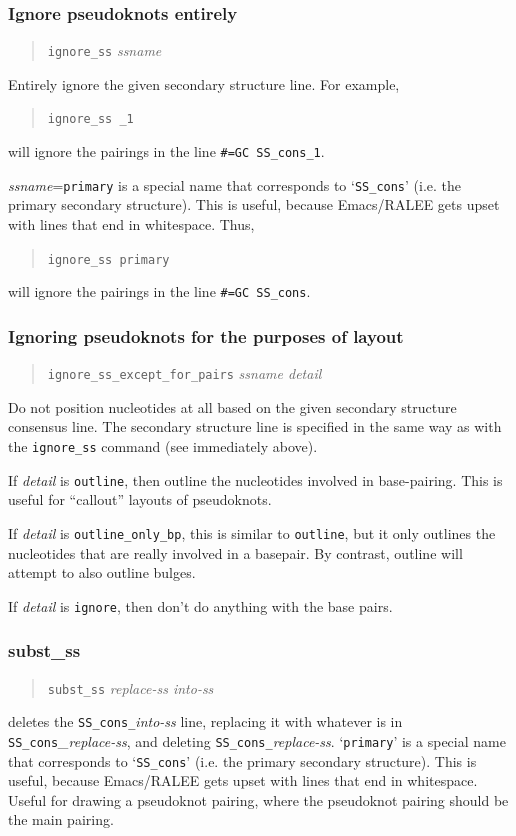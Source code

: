 \documentclass[letterpaper,12pt]{report}
\newcommand{\example}[1]{
\begin{quote}
{\raggedright
#1
}
\end{quote}
}
\newcommand{\examplett}[1]{
\example{{\tt #1}}
}
\begin{document}
\subsubsection{Ignore pseudoknots entirely}
\example{{\tt ignore\_ss} \textit{ssname}}

Entirely ignore the given secondary structure line.  For example,

\examplett{ignore\_ss \_1}

will ignore the pairings in the line {\tt \#=GC SS\_cons\_1}.

\textit{ssname}={\tt primary} is a special
name that corresponds to {\textquoteleft}{\tt SS\_cons}{\textquoteright}
(i.e. the primary secondary structure).  This is useful, because
Emacs/RALEE gets upset with lines that end in whitespace.  Thus,

\examplett{ignore\_ss primary}

will ignore the pairings in the line {\tt \#=GC SS\_cons}.

\subsubsection{Ignoring pseudoknots for the purposes of layout}
\example{
{\tt ignore\_ss\_except\_for\_pairs}
 \textit{ssname  detail}
}

Do not position nucleotides at all based on the given secondary structure
consensus line.
The secondary structure line is specified in the same way
as with the {\tt ignore\_ss} command (see immediately above).

If \textit{detail }is {\tt outline}, then outline the nucleotides involved in
base-pairing.  This is useful for ``callout'' layouts of pseudoknots.

If \textit{detail }is {\tt outline\_only\_bp}, this is similar to {\tt outline}, but
it only outlines the nucleotides that are really involved in a
basepair. By contrast, outline will attempt to also outline bulges.

If \textit{detail }is {\tt ignore}, then don{\textquoteright}t do anything
with the base pairs.

\subsubsection{subst\_ss}
\example{{\tt subst\_ss}  \textit{replace-ss  into-ss}}

deletes the {\tt SS\_cons\_}\textit{into-ss }line, replacing it with whatever
is in {\tt SS\_cons}\textit{\_replace-ss}, and deleting
{\tt SS\_cons\_}\textit{replace-ss}. 
{\textquoteleft}{\tt primary}{\textquoteright} is a special name that
corresponds to {\textquoteleft}{\tt SS\_cons}{\textquoteright} (i.e. the
primary secondary structure).  This is useful, because Emacs/RALEE gets
upset with lines that end in whitespace.  Useful for drawing a
pseudoknot pairing, where the
pseudoknot pairing should be the main pairing.
\end{document}
